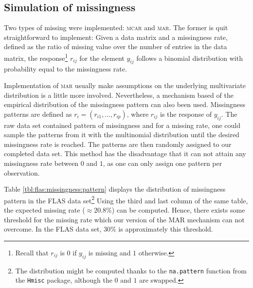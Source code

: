 \subsection{Simulation of missingness}

Two types of missing were implemented: \textsc{mcar} and \textsc{mar}. The
former is quit straightforward to implement: Given a data matrix and a
missingness rate, defined as the ratio of missing value over the number of
entries in the data matrix, the response\footnote{Recall that $r_{ij}$ is $0$
  if $y_{ij}$ is missing and $1$ otherwise.} $r_{ij}$ for the element $y_{ij}$
follows a binomial distribution with probability equal to the missingness rate.

Implementation of \textsc{mar} usually make assumptions on the underlying
multivariate distribution is a little more involved. Nevertheless, a mechanism
based of the empirical distribution of the missingness pattern can also been
used. Missingness patterns are defined as $r_{i} = (r_{i1}, \dots, r_{ip})$,
where $r_{ij}$ is the response of $y_{ij}$. The raw data set contained pattern
of missingness and for a missing rate, one could sample the patterns from it
with the multinomial distribution until the desired missingness rate is
reached. The patterns are then randomly assigned to our completed data
set. This method has the disadvantage that it can not attain any missingness
rate between $0$ and $1$, as one can only assign one pattern per observation.

Table \ref{tbl:flas:missingness:pattern} displays the distribution of
missingness pattern in the FLAS data set\footnote{The distribution might be
  computed thanks to the \texttt{na.pattern} function from the \texttt{Hmisc}
  package, although the $0$ and $1$ are swapped.} Using the third and last
column of the same table, the expected missing rate ($\approx 20.8\%$) can be
computed. Hence, there exists some threshold for the missing rate which our
version of the MAR mechanism can not overcome. In the FLAS data set, 30\% is
approximately this threshold.

